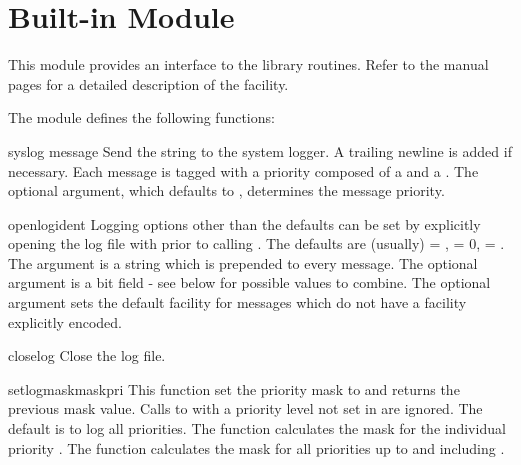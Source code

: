 \section{Built-in Module }
\label{module-syslog}

This module provides an interface to the \UNIX{}  library
routines.  Refer to the \UNIX{} manual pages for a detailed description
of the  facility.

The module defines the following functions:


\begin{funcdesc}{syslog}{ message}
Send the string  to the system logger.
A trailing newline is added if necessary.
Each message is tagged with a priority composed of a  and
a .
The optional  argument, which defaults to
, determines the message priority.
\end{funcdesc}

\begin{funcdesc}{openlog}{ident}
Logging options other than the defaults can be set by explicitly opening
the log file with  prior to calling .
The defaults are (usually)  = ,  = 0,
 = .
The  argument is a string which is prepended to every message.
The optional  argument is a bit field - see below for possible
values to combine.
The optional  argument sets the default facility for messages
which do not have a facility explicitly encoded.
\end{funcdesc}

\begin{funcdesc}{closelog}{}
Close the log file.
\end{funcdesc}

\begin{funcdesc}{setlogmask}{maskpri}
This function set the priority mask to  and returns the
previous mask value.
Calls to  with a priority level not set in 
are ignored.
The default is to log all priorities.
The function  calculates the mask for the
individual priority .
The function  calculates the mask for all priorities
up to and including .
\end{funcdesc}


